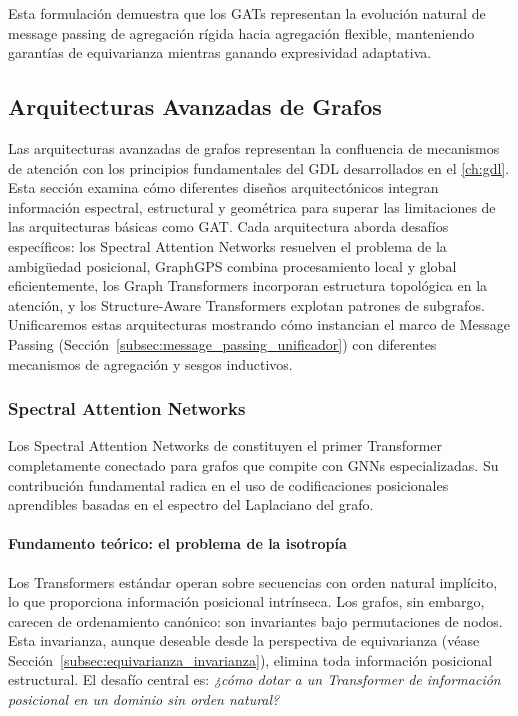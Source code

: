Esta formulación demuestra que los GATs representan la evolución natural de message passing de agregación rígida hacia agregación flexible, manteniendo garantías de equivarianza mientras ganando expresividad adaptativa.

\subsection{Arquitecturas Avanzadas de Grafos}\label{subsec:arquitecturas_avanzadas_grafos}

Las arquitecturas avanzadas de grafos representan la confluencia de mecanismos de atención con los principios fundamentales del \gls{GDL} desarrollados en el \autoref{ch:gdl}. Esta sección examina cómo diferentes diseños arquitectónicos integran información espectral, estructural y geométrica para superar las limitaciones de las arquitecturas básicas como GAT. Cada arquitectura aborda desafíos específicos: los Spectral Attention Networks resuelven el problema de la ambigüedad posicional, GraphGPS combina procesamiento local y global eficientemente, los Graph \glspl{Transformer} incorporan estructura topológica en la atención, y los Structure-Aware \glspl{Transformer} explotan patrones de subgrafos. Unificaremos estas arquitecturas mostrando cómo instancian el marco de Message Passing (Sección~\ref{subsec:message_passing_unificador}) con diferentes mecanismos de agregación y sesgos inductivos.

\subsubsection{Spectral Attention Networks}\label{subsubsec:san_advanced}

Los Spectral Attention Networks de \citet{kreuzer2021spectral} constituyen el primer \gls{Transformer} completamente conectado para grafos que compite con \glspl{GNN} especializadas. Su contribución fundamental radica en el uso de codificaciones posicionales aprendibles basadas en el espectro del Laplaciano del grafo.

\paragraph{Fundamento teórico: el problema de la isotropía}

Los \glspl{Transformer} estándar operan sobre secuencias con orden natural implícito, lo que proporciona información posicional intrínseca. Los grafos, sin embargo, carecen de ordenamiento canónico: son invariantes bajo permutaciones de nodos. Esta invarianza, aunque deseable desde la perspectiva de equivarianza (véase Sección~\ref{subsec:equivarianza_invarianza}), elimina toda información posicional estructural. El desafío central es: \textit{¿cómo dotar a un \gls{Transformer} de información posicional en un dominio sin orden natural?}

